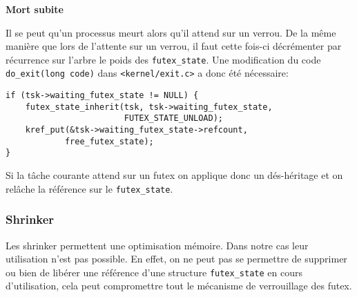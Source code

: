 \vspace{0.25cm}
\noindent \textbf{Mort subite}

Il se peut qu'un processus meurt alors qu'il attend sur un verrou. De la même manière que lors de
l'attente sur un verrou, il faut cette fois-ci décrémenter par récurrence sur l'arbre 
le poids des \verb|futex_state|.
Une modification du code \verb|do_exit(long code)| dans \verb|<kernel/exit.c>| a donc été nécessaire:
\begin{lstlisting}[tabsize=4]
if (tsk->waiting_futex_state != NULL) {
	futex_state_inherit(tsk, tsk->waiting_futex_state,
						FUTEX_STATE_UNLOAD);
	kref_put(&tsk->waiting_futex_state->refcount, 
			free_futex_state);
}
\end{lstlisting}

Si la tâche courante attend sur un futex on applique donc un dés-héritage et on relâche la référence sur le
\verb|futex_state|. 

\subsubsection{Shrinker}

Les shrinker permettent une optimisation mémoire.
Dans notre cas leur utilisation n'est pas possible. En effet, on ne peut pas se permettre 
de supprimer ou bien de libérer une référence d'une structure \verb|futex_state| en cours 
d'utilisation, cela peut compromettre tout le mécanisme de verrouillage des futex.